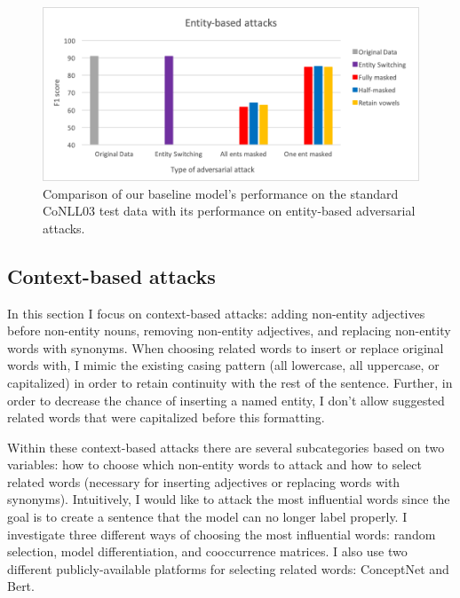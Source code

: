\begin{figure}[h]
	\centering
	\includegraphics[width=0.85\linewidth]{LatexDiss/figures/entityattacks.png}
	\caption{Comparison of our baseline model's performance on the standard CoNLL03 test data with its performance on entity-based adversarial attacks.}
	\label{fig:entityattacksresults}
\end{figure}
 
 
\subsection{Context-based attacks}
In this section I focus on context-based attacks: adding non-entity adjectives before non-entity nouns, removing non-entity adjectives, and replacing non-entity words with synonyms. When choosing related words to insert or replace original words with, I mimic the existing casing pattern (all lowercase, all uppercase, or capitalized) in order to retain continuity with the rest of the sentence. Further, in order to decrease the chance of inserting a named entity, I don't allow suggested related words that were capitalized before this formatting.

Within these context-based attacks there are several subcategories based on two variables: how to choose which non-entity words to attack and how to select related words (necessary for inserting adjectives or replacing words with synonyms). Intuitively, I would like to attack the most influential words since the goal is to create a sentence that the model can no longer label properly. I investigate three different ways of choosing the most influential words: random selection, model differentiation, and cooccurrence matrices. I also use two different publicly-available platforms for selecting related words: ConceptNet and Bert.

